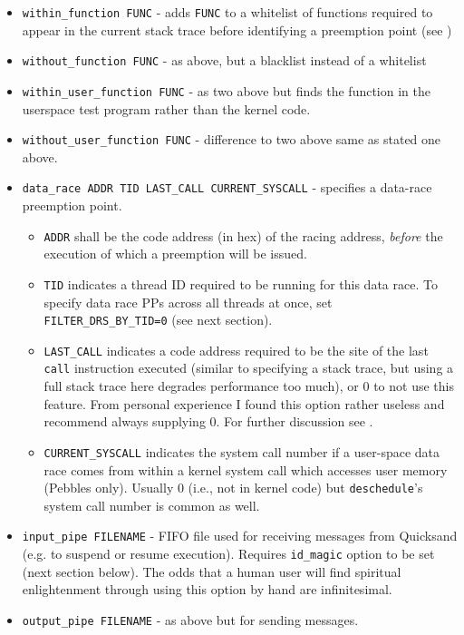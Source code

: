 \begin{itemize}
	\item {\tt within\_function FUNC} - adds {\tt FUNC} to a whitelist of functions required to appear in the current stack trace before identifying a preemption point (see \sect{\ref{sec:landslide-pps}})
	\item {\tt without\_function FUNC} - as above, but a blacklist instead of a whitelist
	\item {\tt within\_user\_function FUNC} - as two above but finds the function in the userspace test program rather than the kernel code.
	\item {\tt without\_user\_function FUNC} - difference to two above same as stated one above.
	\item {\tt data\_race ADDR TID LAST\_CALL CURRENT\_SYSCALL} - specifies a data-race preemption point.
		\begin{itemize}
			\item {\tt ADDR} shall be the code address (in hex) of the racing address,
			{\em before} the execution of which a preemption will be issued.
			\item {\tt TID} indicates a thread ID required to be running for this data race.
				To specify data race PPs across all threads at once, set {\tt FILTER\_DRS\_BY\_TID=0} (see next section).
			\item {\tt LAST\_CALL} indicates a code address required to be the site of the last {\tt call} instruction executed
				(similar to specifying a stack trace, but using a full stack trace here degrades performance too much),
				or 0 to not use this feature.
				From personal experience I found this option rather useless and recommend always supplying 0.
				For further discussion see \sect{\ref{sec:quicksand-pps}}.
			\item {\tt CURRENT\_SYSCALL} indicates the system call number if a user-space data race comes from within a kernel system call which accesses user memory (Pebbles only).
				Usually 0 (i.e., not in kernel code) but {\tt deschedule}'s system call number is common as well.
		\end{itemize}
	\item {\tt input\_pipe FILENAME} - FIFO file used for receiving messages from Quicksand (e.g. to suspend or resume execution).
		Requires {\tt id\_magic} option to be set (next section below).
		The odds that a human user will find spiritual enlightenment through using this option by hand are infinitesimal.
	\item {\tt output\_pipe FILENAME} - as above but for sending messages.
\end{itemize}

